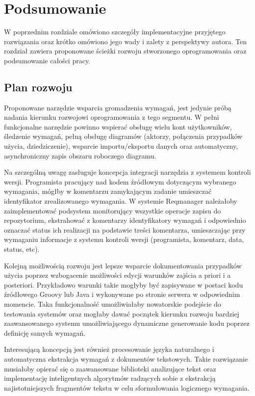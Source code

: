\chapter{Podsumowanie}
  
  W poprzednim rozdziale omówiono szczegóły implementacyjne przyjętego rozwiązania oraz krótko omówiono jego wady i zalety z perspektywy autora. Ten rozdział zawiera proponowane ścieżki rozwoju stworzonego oprogramowania oraz podsumowanie całości pracy.

  \section{Plan rozwoju}
  
    Proponowane narzędzie wsparcia gromadzenia wymagań, jest jedynie próbą nadania kierunku rozwojowi oprogramowania z tego segmentu. W pełni funkcjonalne narzędzie powinno wspierać obsługę wielu kont użytkowników, śledzenie wymagań, pełną obsługę diagramów (aktorzy, połączenia przypadków użycia, dziedziczenie), wsparcie importu/eksportu danych oraz automatyczny, asynchroniczny zapis obszaru roboczego diagramu. 
    
    Na szczególną uwagę zasługuje koncepcja integracji narzędzia z systemem kontroli wersji. Programista pracujący nad kodem źródłowym dotyczącym wybranego wymagania, mógłby w komentarzu zamykającym zadanie umieszczać identyfikator zrealizowanego wymagania. W systemie Reqmanager należałoby zaimplementować podsystem monitorujący wszystkie operacje zapisu do repozytorium, ekstrahować z komentarzy identyfikatory wymagań i odpowiednio oznaczać status ich realizacji na podstawie treści komentarza, umieszczając przy wymaganiu informacje z systemu kontroli wersji (programista, komentarz, data, status, etc).

    Kolejną możliwością rozwoju jest lepsze wsparcie dokumentowania przypadków użycia poprzez wzbogacenie możliwości edycji warunków zajścia a priori i a posteriori. Przykładowo warunki takie mogłyby być zapisywane w postaci kodu źródłowego Groovy lub Java i wykonywane po stronie serwera w odpowiednim momencie. Taka funkcjonalność umożliwiałaby nowatorskie podejście do testowania systemów oraz mogłaby dawać początek kierunku rozwoju bardziej zaawansowanego systemu umożliwiającego dynamiczne generowanie kodu poprzez definicję samych wymagań.

    Interesującą koncepcją jest również procesowanie języka naturalnego i automatyczna ekstrakcja wymagań z dokumentów tekstowych. Takie rozwiązanie musiałoby opierać się o zaawansowane biblioteki analizujące tekst oraz implementację inteligentnych algorytmów radzących sobie z ekstrakcją najistotniejszych fragmentów tekstu w celu sformułowania logicznego wymagania.

